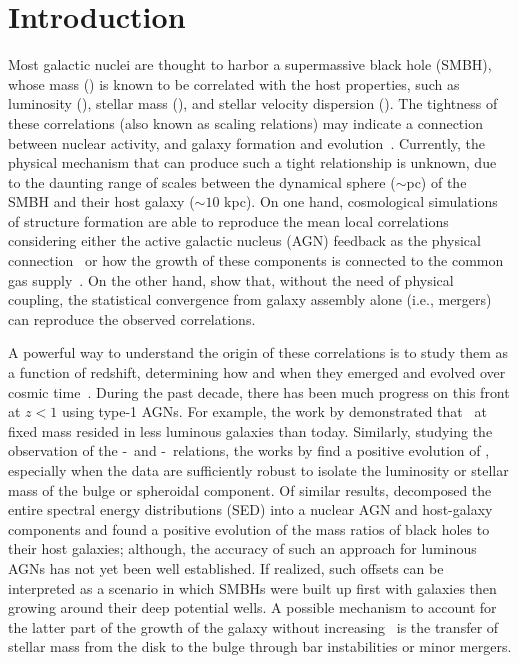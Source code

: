 \documentclass[apj]{emulateapj}
\begin{document}
\section{Introduction}
\label{sec:introduction}
Most galactic nuclei are thought to harbor a supermassive black hole (SMBH), whose mass (\mbh) is known to be correlated with the host properties, such as luminosity (\lhost), stellar mass (\smass), and stellar velocity dispersion (\sigstar). The tightness of these correlations (also known as scaling relations) may indicate a connection between nuclear activity, and galaxy formation and evolution~\citep[e.g.,][]{Mag++98, F+M00, M+H03, Gul++09,Beifi2012, H+R04, Geb++01b, Gra++2011}.
Currently, the physical mechanism that can produce such a tight relationship is unknown, due to the daunting range of scales between the dynamical sphere ($\sim$pc) of the SMBH and their host galaxy ($\sim10$ kpc). On one hand, cosmological simulations of structure formation are able to reproduce the mean local correlations considering either the active galactic nucleus (AGN) feedback as the physical connection~\citep{Springel2005, Hopkins2008, Matteo2008, DeG++15} or how the growth of these components is connected to the common gas supply~\citep{Cen2015, Menci2016}.
On the other hand, \citet{Peng2007, Jahnke2011, Hirschmann2010} show that, without the need of physical coupling, the statistical convergence from galaxy assembly alone (i.e., mergers) can reproduce the observed correlations.

A powerful way to understand the origin of these correlations is to study them as a function of redshift, determining how and when they emerged and evolved over cosmic time~\citep[e.g.,][]{TMB04,Sal++06,Woo++06, Jah++09,SS13,Sun2015}. During the past decade, there has been much progress on this front at $z<1$ using type-1 AGNs. For example, the work by \citet{Park15, Tre++07, Pen++06qsob} demonstrated that \mbh\ at fixed mass resided in less luminous galaxies than today. Similarly, studying the observation of the \mbh-\smass\ and \mbh-\sigstar\ relations, the works by \citet{Bennert11, Woo++08} find a positive evolution of \mbh, especially when the data are sufficiently robust to isolate the luminosity or stellar mass of the bulge or spheroidal component. Of similar results, \citet{Merloni2010} decomposed the entire spectral energy distributions (SED) into a nuclear AGN and host-galaxy components and found a positive evolution of the mass ratios of black holes to their host galaxies; although, the accuracy of such an approach for luminous AGNs has not yet been well established. If realized, such offsets can be interpreted as a scenario in which SMBHs were built up first with galaxies then growing around their deep potential wells.  A possible mechanism to account for the latter part of the growth of the galaxy without increasing \mbh\ is the transfer of stellar mass from the disk to the bulge \citep{Bennert++2011} through bar instabilities or minor mergers. 
\end{document}
